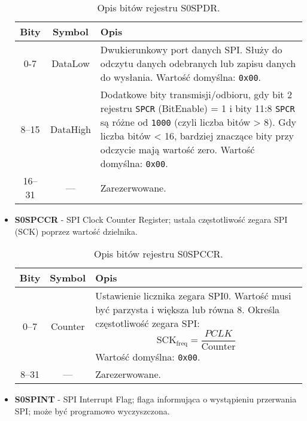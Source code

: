 \begin{itemize}
\begin{table}[H]
\centering
\caption{Opis bitów rejestru S0SPDR.}
\vspace{0.5em}
\renewcommand{\arraystretch}{1.2}
\begin{tabular}{|c|c|p{9.5cm}|}
\hline
\textbf{Bity} & \textbf{Symbol} & \textbf{Opis} \\
\hline
0-7     & DataLow  & Dwukierunkowy port danych SPI. Służy do odczytu danych odebranych lub zapisu danych do wysłania. \newline Wartość domyślna: \texttt{0x00}. \\
\hline
8–15    & DataHigh & Dodatkowe bity transmisji/odbioru, gdy bit 2 rejestru \texttt{SPCR} (BitEnable) = 1 i bity 11:8 \texttt{SPCR} są różne od \texttt{1000} (czyli liczba bitów > 8). \newline Gdy liczba bitów < 16, bardziej znaczące bity przy odczycie mają wartość zero. \newline Wartość domyślna: \texttt{0x00}. \\
\hline
16–31   & —         & Zarezerwowane. \\
\hline
\end{tabular}
\end{table}

    
    \item \textbf{S0SPCCR} - SPI Clock Counter Register; ustala częstotliwość zegara SPI (SCK) poprzez wartość dzielnika.

\begin{table}[H]
\centering
\caption{Opis bitów rejestru S0SPCCR.}
\vspace{0.5em}
\renewcommand{\arraystretch}{1.2}
\begin{tabular}{|c|c|p{9.5cm}|}
\hline
\textbf{Bity} & \textbf{Symbol} & \textbf{Opis} \\
\hline
0–7     & Counter    & Ustawienie licznika zegara SPI0. \newline Wartość musi być parzysta i większa lub równa 8. Określa częstotliwość zegara SPI:  
\[ \text{SCK}_{\text{freq}} = \frac{PCLK}{\text{Counter}} \]
\newline Wartość domyślna: \texttt{0x00}. \\
\hline
8–31    & —          & Zarezerwowane.\\
\hline
\end{tabular}
\end{table}

    
    \item \textbf{S0SPINT} - SPI Interrupt Flag; flaga informująca o wystąpieniu przerwania SPI; może być programowo wyczyszczona.


\end{itemize}
